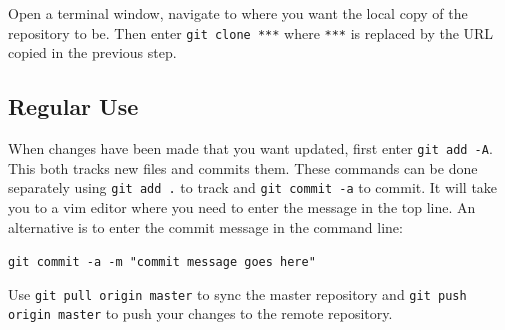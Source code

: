 \documentclass{article}
\begin{document}
Open a terminal window, navigate to where you want the local copy of the repository to be. Then enter \verb|git clone ***| where \verb|***| is replaced by the URL copied in the previous step.

\subsection{Regular Use}

When changes have been made that you want updated, first enter \verb|git add -A|. This both tracks new files and commits them. These commands can be done separately using \verb|git add .| to track and \verb|git commit -a| to commit. It will take you to a vim editor where you need to enter the message in the top line. An alternative is to enter the commit message in the command line:

\begin{center}
    \verb|git commit -a -m "commit message goes here"|
\end{center}

Use \verb|git pull origin master| to sync the master repository and \verb|git push origin master| to push your changes to the remote repository.

\newpage
\end{document}
